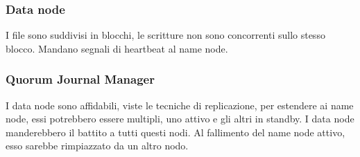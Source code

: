 \subsubsection{Data node}
I file sono suddivisi in blocchi, le scritture non sono concorrenti sullo stesso 
blocco. Mandano segnali di heartbeat al name node.

 
\subsubsection{Quorum Journal Manager}
I data node sono affidabili, viste le tecniche di replicazione, per estendere
ai name node, essi potrebbero essere multipli, uno attivo e gli altri in standby.
I data node manderebbero il battito a tutti questi nodi. Al fallimento del name node 
attivo, esso sarebbe rimpiazzato da un altro nodo.


